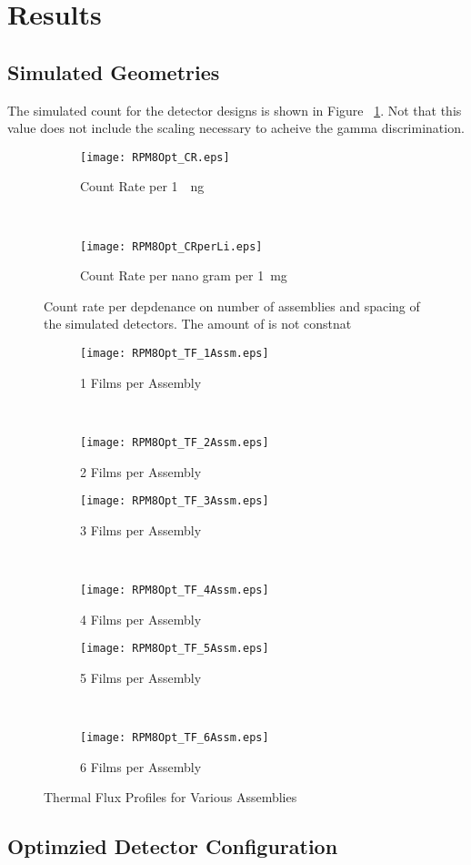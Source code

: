 \section{Results}
\label{sec:Results}

\subsection{Simulated Geometries}

The simulated count for the detector designs is shown in Figure ~\ref{fig:SimCountRate}.
Not that this value does not include the scaling necessary to acheive the gamma discrimination. 
\begin{figure}
    \centering
    \begin{subfigure}[b]{0.45\textwidth}
        \texttt{[image: RPM8Opt\_CR.eps]}
        \caption{Count Rate per \SI{1}{\per\nano\gram{}}}
    \end{subfigure}%
    ~
    \begin{subfigure}[b]{0.45\textwidth}
        \texttt{[image: RPM8Opt\_CRperLi.eps]}
        \caption{Count Rate per nano gram  per \SI{1}{\milli\gram} }
    \end{subfigure}
    \caption{Count rate per depdenance on number of assemblies and spacing of the simulated detectors. The amount of  is not constnat}
    \label{fig:SimCountRate}
\end{figure}

\begin{figure}
	\centering
	\begin{subfigure}[b]{0.43\textwidth}
		\centering
		\texttt{[image: RPM8Opt\_TF\_1Assm.eps]}
    \caption{1 Films per Assembly}
	\end{subfigure}%
	~
	\begin{subfigure}[b]{0.43\textwidth}
		\centering
		\texttt{[image: RPM8Opt\_TF\_2Assm.eps]}
    \caption{2 Films per Assembly}
	\end{subfigure}	
	
  \begin{subfigure}[b]{0.43\textwidth}
		\centering
		\texttt{[image: RPM8Opt\_TF\_3Assm.eps]}
    \caption{3 Films per Assembly}
	\end{subfigure}%
	~
	\begin{subfigure}[b]{0.43\textwidth}
		\centering
		\texttt{[image: RPM8Opt\_TF\_4Assm.eps]}
    \caption{4 Films per Assembly}
	\end{subfigure}	

	\begin{subfigure}[b]{0.43\textwidth}
		\centering
		\texttt{[image: RPM8Opt\_TF\_5Assm.eps]}
    \caption{5 Films per Assembly}
	\end{subfigure}%
	~
	\begin{subfigure}[b]{0.43\textwidth}
		\centering
		\texttt{[image: RPM8Opt\_TF\_6Assm.eps]}
    \caption{6 Films per Assembly}
	\end{subfigure}

	\caption{Thermal Flux Profiles for Various Assemblies}
	\label{fig:ThermalFlux}
\end{figure}
\subsection{Optimzied Detector Configuration}
